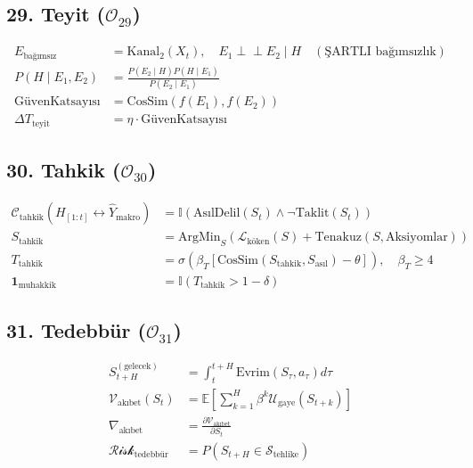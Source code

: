 \documentclass[11pt, a4paper]{article}
\begin{document}
\subsection{29. Teyit ($\mathcal{O}_{29}$)}
\begin{align}
E_{\text{bağımsız}} &= \text{Kanal}_2(X_t), \quad E_1 \perp\!\!\!\perp E_2 \mid H \quad (\text{ŞARTLI bağımsızlık}) \\
P(H \mid E_1, E_2) &= \frac{P(E_2 \mid H) P(H \mid E_1)}{P(E_2 \mid E_1)} \\
\text{GüvenKatsayısı} &= \text{CosSim}(f(E_1), f(E_2)) \\
\Delta T_{\text{teyit}} &= \eta \cdot \text{GüvenKatsayısı}
\end{align}

\subsection{30. Tahkik ($\mathcal{O}_{30}$)}
\begin{align}
\mathcal{C}_{\text{tahkik}}(H_{[1:t]} \leftrightarrow \hat{Y}_{\text{makro}}) &= \mathbb{I}\left( \text{AsılDelil}(S_t) \land \neg \text{Taklit}(S_t) \right) \\
S_{\text{tahkik}} &= \text{ArgMin}_{S} \left( \mathcal{L}_{\text{köken}}(S) + \text{Tenakuz}(S, \text{Aksiyomlar}) \right) \\
T_{\text{tahkik}} &= \sigma\left( \beta_T \left[ \text{CosSim}(S_{\text{tahkik}}, S_{\text{asıl}}) - \theta \right] \right), \quad \beta_T \ge 4 \\
\mathbf{1}_{\text{muhakkik}} &= \mathbb{I}(T_{\text{tahkik}} > 1 - \delta)
\end{align}

\subsection{31. Tedebbür ($\mathcal{O}_{31}$)}
\begin{align}
S_{t+H}^{(\text{gelecek})} &= \int_t^{t+H} \text{Evrim}(S_\tau, a_\tau) d\tau \\
\mathcal{V}_{\text{akıbet}}(S_t) &= \mathbb{E}\left[ \sum_{k=1}^H \beta^k \mathcal{U}_{\text{gaye}}(S_{t+k}) \right] \\
\nabla_{\text{akıbet}} &= \frac{\partial \mathcal{V}_{\text{akıbet}}}{\partial S_t} \\
\mathcal{Risk}_{\text{tedebbür}} &= P(S_{t+H} \in \mathcal{S}_{\text{tehlike}})
\end{align}
\end{document}
